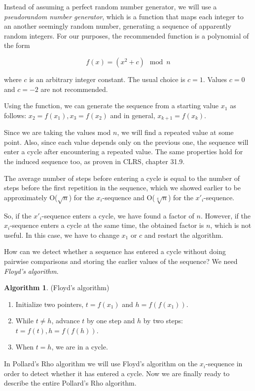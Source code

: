 \documentclass[12pt] {article}
\theoremstyle{plain}
\theoremstyle{definition}
\newtheorem{algo}[thm]{Algorithm}
\begin{document}
Instead of assuming a perfect random number generator, we will use a \textit{pseudorandom number generator}, which is a function that maps each integer to an another seemingly random number, generating a sequence of apparently random integers. For our purposes, the recommended function is a polynomial of the form

\[
	f(x) = (x^2 + c) \mod n
\]

where $c$ is an arbitrary integer constant. The usual choice is $c = 1$. Values $c = 0$ and $c = -2$ are not recommended\cite{pollard}.

Using the function, we can generate the sequence from a starting value $x_1$ as follows: $x_2 = f(x_1), x_3 = f(x_2)$ and in general, $x_{k+1} = f(x_k)$.

Since we are taking the values mod $n$, we will find a repeated value at some point. Also, since each value depends only on the previous one, the sequence will enter a cycle after encountering a repeated value. The same properties hold for the induced sequence too, as proven in CLRS, chapter 31.9\cite{clrs}.

The average number of steps before entering a cycle is equal to the number of steps before the first repetition in the sequence, which we showed earlier to be approximately O($\sqrt{n}$) for the $x_i$-sequence and O($\sqrt[4]{n}$) for the $x'_i$-sequence.

So, if the $x'_i$-sequence enters a cycle, we have found a factor of $n$. However, if the $x_i$-sequence enters a cycle at the same time, the obtained factor is $n$, which is not useful. In this case, we have to change $x_1$ or $c$ and restart the algorithm.

How can we detect whether a sequence has entered a cycle without doing pairwise comparisons and storing the earlier values of the sequence? We need \textit{Floyd's algorithm}\cite{cphb}.

\begin{algo} (Floyd's algorithm)
\begin{enumerate}
\item Initialize two pointers, $t = f(x_1)$ and $h = f(f(x_1))$.
\item While $t \neq h$, advance $t$ by one step and $h$ by two steps: $t = f(t), h = f(f(h))$.
\item When $t = h$, we are in a cycle.
\end{enumerate}
\end{algo}

In Pollard's Rho algorithm we will use Floyd's algorithm on the $x_i$-sequence in order to detect whether it has entered a cycle. Now we are finally ready to describe the entire Pollard's Rho algorithm.
\end{document}
